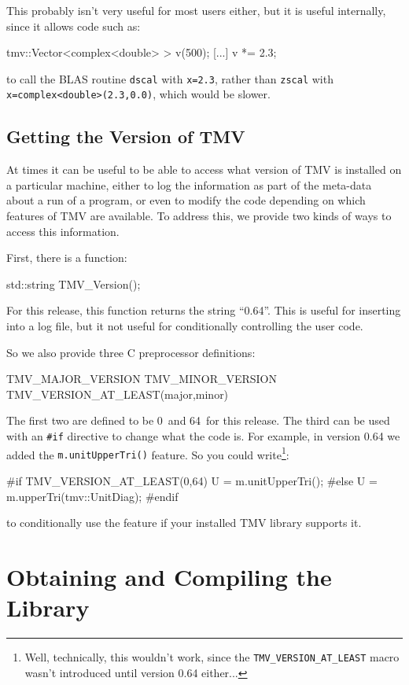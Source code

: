 \documentclass[twoside,letterpaper,11pt]{article}
\newcommand{\tmvversion}{0.64}
\newcommand{\tmvmajorversion}{0}
\newcommand{\tmvminorversion}{64}
\renewcommand{\tt}[1]{{\lstinline {#1}}}
\begin{document}
This probably isn't very useful for most users either, but it is useful internally,
since it allows code such as:
\begin{tmvcode}
tmv::Vector<complex<double> > v(500);
[...]
v *= 2.3;
\end{tmvcode}
to call the BLAS routine \tt{dscal} with \tt{x=2.3}, rather than \tt{zscal}
with \tt{x=complex<double>(2.3,0.0)}, which would be slower.

\subsection{Getting the Version of TMV}

At times it can be useful to be able to access what version of TMV is installed on a 
particular machine, either to log the information as part of the meta-data about a
run of a program, or even to modify the code depending on which features of TMV
are available.  To address this, we provide two kinds of ways to access this information.

First, there is a function:
\begin{tmvcode}
std::string TMV_Version();
\end{tmvcode}
For this release, this function returns the string ``\tmvversion''.  This is useful for inserting
into a log file, but it not useful for conditionally controlling the user code.

So we also provide three C preprocessor definitions:
\begin{tmvcode}
TMV_MAJOR_VERSION
TMV_MINOR_VERSION
TMV_VERSION_AT_LEAST(major,minor)
\end{tmvcode}
The first two are defined to be \tmvmajorversion\ and \tmvminorversion\ for this release.
The third can be used with an \tt{#if} directive to change what the code is.
For example, in version 0.64 we added the \tt{m.unitUpperTri()} feature.  So you could
write\footnote{
Well, technically, this wouldn't work, since the \tt{TMV_VERSION_AT_LEAST} macro
wasn't introduced until version 0.64 either...}:
\begin{tmvcode}
#if TMV_VERSION_AT_LEAST(0,64)
U = m.unitUpperTri();
#else
U = m.upperTri(tmv::UnitDiag);
#endif
\end{tmvcode}
to conditionally use the feature if your installed TMV library supports it.

\newpage
\section{Obtaining and Compiling the Library}
\label{Install}
\end{document}
